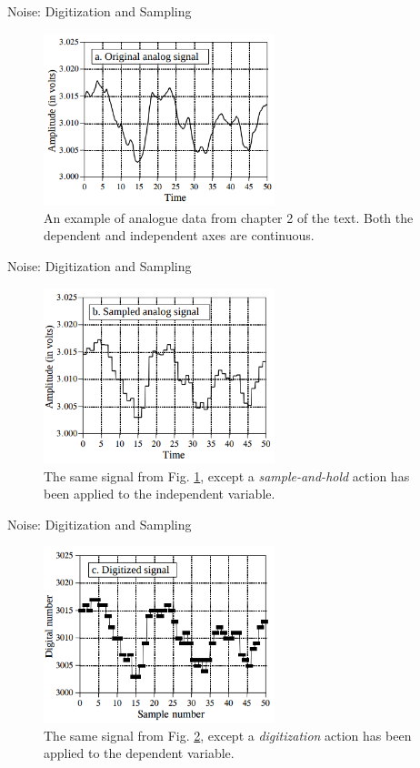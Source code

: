 \documentclass{beamer}
\begin{document}
\begin{frame}[fragile]{Noise: Digitization and Sampling}
\begin{figure}
\centering
\includegraphics[width=0.6\textwidth]{figures/adc_dac1.png}
\caption{\label{fig:adc1} An example of analogue data from chapter 2 of the text.  Both the dependent and independent axes are continuous.}
\end{figure}
\end{frame}

\begin{frame}[fragile]{Noise: Digitization and Sampling}
\begin{figure}
\centering
\includegraphics[width=0.6\textwidth]{figures/adc_dac2.png}
\caption{\label{fig:adc2} The same signal from Fig. \ref{fig:adc1}, except a \textit{sample-and-hold} action has been applied to the independent variable.}
\end{figure}
\end{frame}

\begin{frame}[fragile]{Noise: Digitization and Sampling}
\begin{figure}
\centering
\includegraphics[width=0.6\textwidth]{figures/adc_dac3.png}
\caption{\label{fig:adc3} The same signal from Fig. \ref{fig:adc2}, except a \textit{digitization} action has been applied to the dependent variable.}
\end{figure}
\end{frame}
\end{document}
